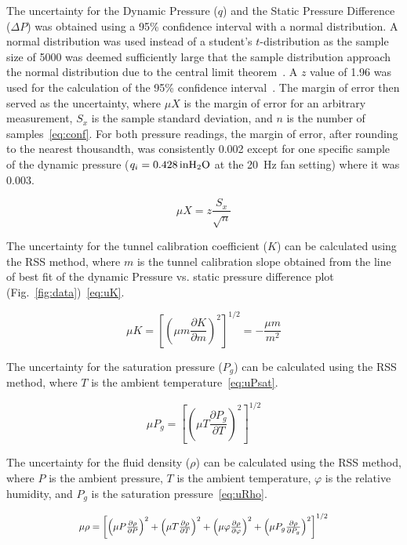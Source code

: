 \documentclass[journal,letterpaper]{IEEEtran}
\begin{document}
The uncertainty for the Dynamic Pressure ($q$) and the Static Pressure Difference ($\Delta P$) was obtained using a 95\% confidence interval with a normal distribution.
A normal distribution was used instead of a student's $t$-distribution as the sample size of 5000 was deemed sufficiently large that the sample distribution approach the normal distribution due to the central limit theorem~\cite{MoMLecture}.
A $z$ value of 1.96 was used for the calculation of the 95\% confidence interval~\cite{MoMLecture}.
The margin of error then served as the uncertainty, where $\mu X$ is the margin of error for an arbitrary measurement, $S_x$ is the sample standard deviation, and $n$ is the number of samples~\eqref{eq:conf}.
For both pressure readings, the margin of error, after rounding to the nearest thousandth, was consistently 0.002 except for one specific sample of the dynamic pressure ($q_i = \qty{0.428}{in\ce{H_2O}}$ at the \qty{20}{\Hz} fan setting) where it was 0.003.

\begin{equation} \label{eq:conf}
    \mu X = z \frac{S_x}{\sqrt{n}}
\end{equation}

The uncertainty for the tunnel calibration coefficient ($K$) can be calculated using the RSS method, where $m$ is the tunnel calibration slope obtained from the line of best fit of the dynamic Pressure vs. static pressure difference plot (Fig.~\ref{fig:data})~\eqref{eq:uK}.

\begin{equation} \label{eq:uK}
    \mu K = \left[\left(\mu m \frac{\partial K}{\partial m}\right)^2\right]^{1/2} = -\frac{\mu m}{m^2}
\end{equation}

The uncertainty for the saturation pressure ($P_g$) can be calculated using the RSS method, where $T$ is the ambient temperature~\eqref{eq:uPsat}.

\begin{equation} \label{eq:uPsat}
    \mu P_g = \left[\left(\mu T \frac{\partial P_g}{\partial T}\right)^2\right]^{1/2}
\end{equation}

The uncertainty for the fluid density ($\rho$) can be calculated using the RSS method, where $P$ is the ambient pressure, $T$ is the ambient temperature, $\varphi$ is the relative humidity, and $P_g$ is the saturation pressure~\eqref{eq:uRho}.

\begin{equation} \label{eq:uRho}
    \resizebox{227pt}{!}{$\mu \rho = \left[\left(\mu P \frac{\partial \rho}{\partial P}\right)^2 + \left(\mu T \frac{\partial \rho}{\partial T}\right)^2 + \left(\mu \varphi \frac{\partial \rho}{\partial \varphi}\right)^2 + \left(\mu P_g \frac{\partial \rho}{\partial P_g}\right)^2\right]^{1/2}$}
\end{equation}
\end{document}
